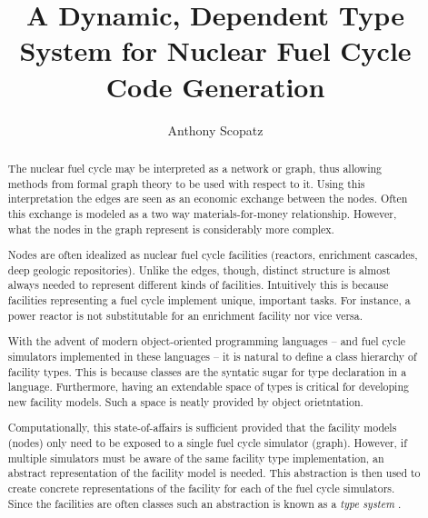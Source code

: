 \documentclass{ansconf}
\begin{document}
\title{A Dynamic, Dependent Type System for Nuclear Fuel Cycle Code Generation}

\author{Anthony Scopatz}

\maketitle

\begin{abstract}
\raggedright
The nuclear fuel cycle may be interpreted as a network or graph, thus 
allowing methods from formal graph theory \cite{DIE05B} to be used with 
respect to it.  Using this interpretation the edges are seen as an economic exchange 
between the nodes.  Often this exchange is modeled as a two way materials-for-money 
relationship.  However, what the nodes in the graph represent is considerably 
more complex.  

Nodes are often idealized as nuclear fuel cycle facilities (reactors, enrichment
cascades, deep geologic repositories).  Unlike the edges, though, distinct structure
is almost always needed to represent different kinds of facilities.  Intuitively 
this is because facilities representing a fuel cycle implement unique, important 
tasks.  For instance, a power reactor is not substitutable for an enrichment facility
nor vice versa.  

With the advent of modern object-oriented programming languages -- and fuel cycle
simulators implemented in these languages -- it is natural to define a class 
hierarchy of facility types.  This is because classes are the syntatic sugar for type 
declaration in a language.  Furthermore, having an extendable space of types is 
critical for developing new facility models.  Such a space is neatly provided by 
object orietntation.

Computationally, this state-of-affairs is sufficient provided that the facility 
models (nodes) only need to be exposed to a single fuel cycle simulator (graph).
However, if multiple simulators must be aware of the same facility type 
implementation, an  abstract representation of the facility model is needed.  
This abstraction is then
used to create concrete representations of the facility for each of the fuel cycle
simulators.  Since the facilities are often classes such an abstraction is 
known as a \emph{type system} \cite{Pierce:2002:TPL:509043}.


\end{abstract}
\end{document}
